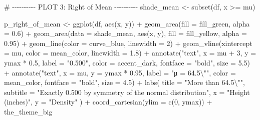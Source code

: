 \documentclass[
  letterpaper,
  DIV=11,
  numbers=noendperiod]{scrreprt}
\newenvironment{Shaded}{\begin{snugshade}}{\end{snugshade}}
\newcommand{\AttributeTok}[1]{\textcolor[rgb]{0.40,0.45,0.13}{#1}}
\newcommand{\CommentTok}[1]{\textcolor[rgb]{0.37,0.37,0.37}{#1}}
\newcommand{\DecValTok}[1]{\textcolor[rgb]{0.68,0.00,0.00}{#1}}
\newcommand{\FloatTok}[1]{\textcolor[rgb]{0.68,0.00,0.00}{#1}}
\newcommand{\FunctionTok}[1]{\textcolor[rgb]{0.28,0.35,0.67}{#1}}
\newcommand{\NormalTok}[1]{\textcolor[rgb]{0.00,0.23,0.31}{#1}}
\newcommand{\OtherTok}[1]{\textcolor[rgb]{0.00,0.23,0.31}{#1}}
\newcommand{\SpecialCharTok}[1]{\textcolor[rgb]{0.37,0.37,0.37}{#1}}
\newcommand{\StringTok}[1]{\textcolor[rgb]{0.13,0.47,0.30}{#1}}
\begin{document}
\begin{Shaded}
\begin{Highlighting}[]
\CommentTok{\# {-}{-}{-}{-}{-}{-}{-}{-}{-}{-} PLOT 3: Right of Mean {-}{-}{-}{-}{-}{-}{-}{-}{-}{-}}
\NormalTok{shade\_mean }\OtherTok{\textless{}{-}} \FunctionTok{subset}\NormalTok{(df, x }\SpecialCharTok{\textgreater{}=}\NormalTok{ mu)}

\NormalTok{p\_right\_of\_mean }\OtherTok{\textless{}{-}} \FunctionTok{ggplot}\NormalTok{(df, }\FunctionTok{aes}\NormalTok{(x, y)) }\SpecialCharTok{+}
  \FunctionTok{geom\_area}\NormalTok{(}\AttributeTok{fill =}\NormalTok{ fill\_green, }\AttributeTok{alpha =} \FloatTok{0.6}\NormalTok{) }\SpecialCharTok{+}
  \FunctionTok{geom\_area}\NormalTok{(}\AttributeTok{data =}\NormalTok{ shade\_mean, }\FunctionTok{aes}\NormalTok{(x, y), }\AttributeTok{fill =}\NormalTok{ fill\_yellow, }\AttributeTok{alpha =} \FloatTok{0.95}\NormalTok{) }\SpecialCharTok{+}
  \FunctionTok{geom\_line}\NormalTok{(}\AttributeTok{color =}\NormalTok{ curve\_blue, }\AttributeTok{linewidth =} \DecValTok{2}\NormalTok{) }\SpecialCharTok{+}
  \FunctionTok{geom\_vline}\NormalTok{(}\AttributeTok{xintercept =}\NormalTok{ mu, }\AttributeTok{color =}\NormalTok{ mean\_color, }\AttributeTok{linewidth =} \FloatTok{1.8}\NormalTok{) }\SpecialCharTok{+}
  \FunctionTok{annotate}\NormalTok{(}\StringTok{"text"}\NormalTok{, }\AttributeTok{x =}\NormalTok{ mu }\SpecialCharTok{+} \DecValTok{3}\NormalTok{, }\AttributeTok{y =}\NormalTok{ ymax }\SpecialCharTok{*} \FloatTok{0.5}\NormalTok{, }\AttributeTok{label =} \StringTok{"0.500"}\NormalTok{, }
           \AttributeTok{color =}\NormalTok{ accent\_dark, }\AttributeTok{fontface =} \StringTok{"bold"}\NormalTok{, }\AttributeTok{size =} \FloatTok{5.5}\NormalTok{) }\SpecialCharTok{+}
  \FunctionTok{annotate}\NormalTok{(}\StringTok{"text"}\NormalTok{, }\AttributeTok{x =}\NormalTok{ mu, }\AttributeTok{y =}\NormalTok{ ymax }\SpecialCharTok{*} \FloatTok{0.95}\NormalTok{, }\AttributeTok{label =} \StringTok{"μ = 64.5}\SpecialCharTok{\textbackslash{}"}\StringTok{"}\NormalTok{, }
           \AttributeTok{color =}\NormalTok{ mean\_color, }\AttributeTok{fontface =} \StringTok{"bold"}\NormalTok{, }\AttributeTok{size =} \FloatTok{4.5}\NormalTok{) }\SpecialCharTok{+}
  \FunctionTok{labs}\NormalTok{(}
    \AttributeTok{title =} \StringTok{"More than 64.5}\SpecialCharTok{\textbackslash{}"}\StringTok{"}\NormalTok{,}
    \AttributeTok{subtitle =} \StringTok{"Exactly 0.500 by symmetry of the normal distribution"}\NormalTok{,}
    \AttributeTok{x =} \StringTok{"Height (inches)"}\NormalTok{, }\AttributeTok{y =} \StringTok{"Density"}
\NormalTok{  ) }\SpecialCharTok{+}
  \FunctionTok{coord\_cartesian}\NormalTok{(}\AttributeTok{ylim =} \FunctionTok{c}\NormalTok{(}\DecValTok{0}\NormalTok{, ymax)) }\SpecialCharTok{+}
\NormalTok{  the\_theme\_big}


\end{Highlighting}
\end{Shaded}
\end{document}
